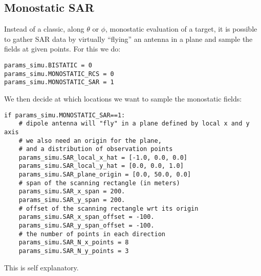 \documentclass[a4paper,10pt]{book}
\begin{document}
\subsection{Monostatic SAR}
%
\par
Instead of a classic, along $\theta$ or $\phi$, monostatic evaluation of a target, it is possible to gather SAR data by virtually ``flying'' an antenna in a plane and sample the fields at given points. For this we do:
\begin{verbatim}
params_simu.BISTATIC = 0
params_simu.MONOSTATIC_RCS = 0
params_simu.MONOSTATIC_SAR = 1
\end{verbatim}
%
\par
We then decide at which locations we want to sample the monostatic fields:
\begin{verbatim}
if params_simu.MONOSTATIC_SAR==1:
    # dipole antenna will "fly" in a plane defined by local x and y axis
    # we also need an origin for the plane, 
    # and a distribution of observation points
    params_simu.SAR_local_x_hat = [-1.0, 0.0, 0.0]
    params_simu.SAR_local_y_hat = [0.0, 0.0, 1.0]
    params_simu.SAR_plane_origin = [0.0, 50.0, 0.0]
    # span of the scanning rectangle (in meters)
    params_simu.SAR_x_span = 200.
    params_simu.SAR_y_span = 200.
    # offset of the scanning rectangle wrt its origin
    params_simu.SAR_x_span_offset = -100.
    params_simu.SAR_y_span_offset = -100.
    # the number of points in each direction
    params_simu.SAR_N_x_points = 8
    params_simu.SAR_N_y_points = 3
\end{verbatim}
This is self explanatory. 
\end{document}
